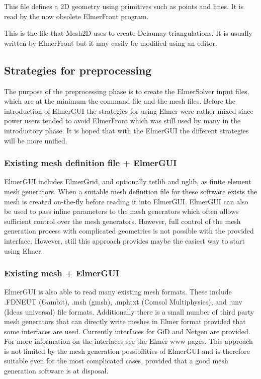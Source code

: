 This file defines a 2D geometry using primitives such as points and lines.
It is read by the now obsolete ElmerFront program.

This is the file that Mesh2D uses to create Delaunay triangulations. 
It is usually written by ElmerFront but it may easily be modified using an editor.


\sifend 


\subsection{Strategies for preprocessing}

The purpose of the preprocessing phase is to create the ElmerSolver input files, which 
are at the minimum the command file and the mesh files. Before the introduction of ElmerGUI
the strategies for using Elmer were rather mixed since power users tended to avoid ElmerFront
which was still used by many in the introductory phase. It is hoped that with the ElmerGUI
the different strategies will be more unified. 


\subsubsection*{Existing mesh definition file + ElmerGUI}

ElmerGUI includes 
ElmerGrid, and optionally tetlib and nglib,
as finite element mesh generators.
When a suitable mesh definition file for these software exists the mesh is created on-the-fly
before reading it into ElmerGUI. ElmerGUI can also be used to pass inline parameters to the mesh
generators which often allows sufficient control over the mesh generators. However, full control 
of the mesh generation process with complicated geometries is not possible with the provided interface.
However, still this approach provides maybe the easiest way to start using Elmer. 


\subsubsection*{Existing mesh + ElmerGUI}

ElmerGUI is also able to read many existing mesh formats. These include .FDNEUT (Gambit), 
.msh (gmsh), .mphtxt (Comsol Multiphysics), and .unv (Ideas universal) file formats. 
Additionally there is a small number of third party mesh generators that can directly write meshes in Elmer format
provided that some interfaces are used. Currently interfaces for GiD and Netgen are provided. 
For more information on the interfaces see the Elmer www-pages. 
This approach is not limited by the mesh generation possibilities of ElmerGUI and is therefore suitable 
even for the most complicated cases, provided that a good mesh generation software is at disposal.


